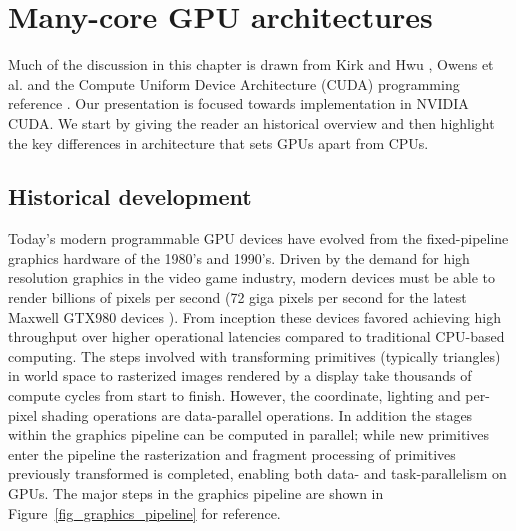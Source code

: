 \section{Many-core GPU architectures}
Much of the discussion in this chapter is drawn from Kirk and Hwu \cite[ch. 1-3]{kirk2012programming}, Owens et al. \cite{owens2008gpu} and the Compute Uniform Device Architecture (CUDA)
programming reference \cite{cuda}. Our presentation is focused towards implementation in NVIDIA CUDA. We start by giving the reader an historical overview and then highlight the key differences
in architecture that sets GPUs apart from CPUs.
\subsection{Historical development}
Today's modern programmable GPU devices have evolved from the fixed-pipeline graphics hardware of the 1980's and 1990's. Driven by the demand
for high resolution graphics in the video game industry, modern devices must be able to render billions of pixels per second (72 giga pixels per second 
for the latest Maxwell GTX980 devices \cite{gtx980}). From inception these devices favored achieving high throughput over higher operational latencies compared to traditional
CPU-based computing. The steps involved with transforming primitives (typically triangles) in world space to rasterized images rendered by a display take thousands
of compute cycles from start to finish. However, the coordinate, lighting and per-pixel shading operations are data-parallel operations. In addition the stages within
the graphics pipeline can be computed in parallel; while new primitives enter the pipeline the rasterization and fragment processing of primitives previously transformed is 
completed, enabling both data- and task-parallelism on GPUs. The major steps in the graphics pipeline are shown in Figure~\ref{fig_graphics_pipeline} for reference.

